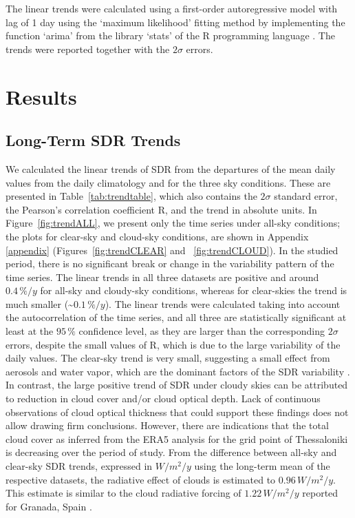 \documentclass[applsci,article,submit,moreauthors,pdftex]{Definitions/mdpi}
\begin{document}
The linear trends were calculated using a first-order autoregressive
model with lag of 1 day using the `maximum likelihood' fitting method
\citep{Gardner1980, Jones1980} by implementing the function `arima' from
the library `stats' of the R programming language \citep{RCT2023}. The
trends were reported together with the \(2\sigma\) errors.

\hypertarget{results}{%
\section{Results}\label{results}}

\hypertarget{long-term-sdr-trends}{%
\subsection{Long-Term SDR Trends}\label{long-term-sdr-trends}}

We calculated the linear trends of SDR from the departures of the mean
daily values from the daily climatology and for the three sky
conditions. These are presented in Table~\ref{tab:trendtable}, which
also contains the \(2\sigma\) standard error, the Pearson's correlation
coefficient R, and the trend in absolute units. In
Figure~\ref{fig:trendALL}, we present only the time series under all-sky
conditions; the plots for clear-sky and cloud-sky conditions, are shown
in Appendix \ref{appendix} (Figures~\ref{fig:trendCLEAR} and~
\ref{fig:trendCLOUD}). In the studied period, there is no significant
break or change in the variability pattern of the time series. The
linear trends in all three datasets are positive and around
\(0.4\,\%/y\) for all-sky and cloudy-sky conditions, whereas for
clear-skies the trend is much smaller (\textasciitilde{}\(0.1\,\%/y\)).
The linear trends were calculated taking into account the
autocorrelation of the time series, and all three are statistically
significant at least at the \(95\,\%\) confidence level, as they are
larger than the corresponding \(2\sigma\) errors, despite the small
values of R, which is due to the large variability of the daily values.
The clear-sky trend is very small, suggesting a small effect from
aerosols and water vapor, which are the dominant factors of the SDR
variability \citep{Fountoulakis2016, Siomos2018, Yu2022}. In contrast,
the large positive trend of SDR under cloudy skies can be attributed to
reduction in cloud cover and/or cloud optical depth. Lack of continuous
observations of cloud optical thickness that could support these
findings does not allow drawing firm conclusions. However, there are
indications that the total cloud cover as inferred from the ERA5
analysis for the grid point of Thessaloniki is decreasing over the
period of study. From the difference between all-sky and clear-sky SDR
trends, expressed in \(W/m^2/y\) using the long-term mean of the
respective datasets, the radiative effect of clouds is estimated to
\(0.96\,W/m^2/y\). This estimate is similar to the cloud radiative
forcing of \(1.22\,W/m^2/y\) reported for Granada, Spain
\citep{Lozano2023}.
\end{document}
